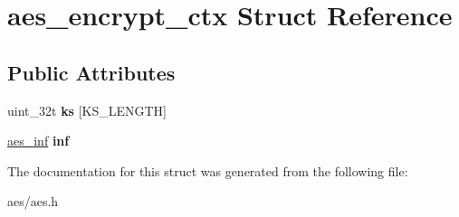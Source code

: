\hypertarget{structaes__encrypt__ctx}{}\section{aes\+\_\+encrypt\+\_\+ctx Struct Reference}
\label{structaes__encrypt__ctx}
\subsection*{Public Attributes}
\begin{DoxyCompactItemize}
\item 
uint\+\_\+32t {\bfseries ks} \mbox{[}K\+S\+\_\+\+L\+E\+N\+G\+TH\mbox{]}\hypertarget{structaes__encrypt__ctx_ab4e2dad259dd53c5c8fa28b3833db3f0}{}\label{structaes__encrypt__ctx_ab4e2dad259dd53c5c8fa28b3833db3f0}

\item 
\hyperlink{unionaes__inf}{aes\+\_\+inf} {\bfseries inf}\hypertarget{structaes__encrypt__ctx_a41fb0a5b39313d9f525ac1ec97e5eb9d}{}\label{structaes__encrypt__ctx_a41fb0a5b39313d9f525ac1ec97e5eb9d}

\end{DoxyCompactItemize}


The documentation for this struct was generated from the following file\+:\begin{DoxyCompactItemize}
\item 
aes/aes.\+h\end{DoxyCompactItemize}
